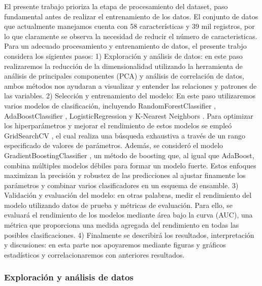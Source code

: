 \documentclass[
  number,
  preprint,
  3p,
  twocolumn]{elsarticle}
\begin{document}
El presente trabajo prioriza la etapa de procesamiento del dataset, paso
fundamental antes de realizar el entrenamiento de los datos. El conjunto
de datos que actualmente manejamos cuenta con 58 características y 39
mil registros, por lo que claramente se observa la necesidad de reducir
el número de caracteristicas. Para un adecuado procesamiento y
entrenamiento de datos, el presente trabjo considera los sigientes
pasos: 1) Exploración y análisis de datos: en este paso realizaremos la
reducción de la dimensionalidad utilizando la herramienta de análisis de
principales componentes (PCA) y análisis de correlación de datos, ambos
métodos nos ayudaran a visualizar y entender las relaciones y patrones
de las variables. 2) Selección y entrenamiento del modelo: En este paso
utilizaremos varios modelos de clasificación, incluyendo
RandomForestClassifier \citep{Breiman2001}, AdaBoostClassifier
\citep{Freund1997}, LogisticRegression \citep{Cox1958} y K-Nearest
Neighbors \citep{Hodges1951}. Para optimizar los hiperparámetros y
mejorar el rendimiento de estos modelos se empleó GridSearchCV
\citep{Pedregosa2011}, el cual realiza una búsqueda exhaustiva a través
de un rango especificado de valores de parámetros. Además, se consideró
el modelo GradientBoostingClassifier \citep{Friedman2001}, un método de
boosting que, al igual que AdaBoost, combina múltiples modelos débiles
para formar un modelo fuerte. Estos enfoques maximizan la precisión y
robustez de las predicciones al ajustar finamente los parámetros y
combinar varios clasificadores en un esquema de ensamble. 3) Validación
y evaluación del modelo: en otras palabras, medir el rendimiento del
modelo utilizando datos de prueba y métricas de evaluación. Para ello,
se evaluará el rendimiento de los modelos mediante área bajo la curva
(AUC), una métrica que proporciona una medida agregada del rendimiento
en todas las posibles clasificaciones. 4) Finalmente se describirá los
resultados, interpretación y discusiones: en esta parte nos apoyaremos
mediante figuras y gráficos estadísticos y correlacionaremos con
anteriores resultados.

\subsubsection{Exploración y análisis de
datos}\label{exploraciuxf3n-y-anuxe1lisis-de-datos}
\end{document}

